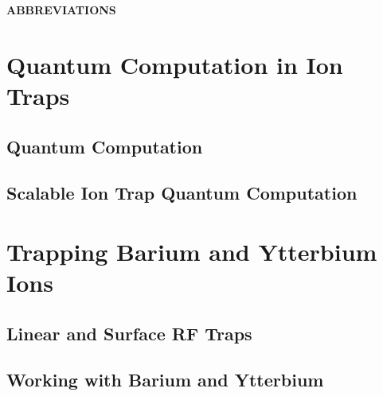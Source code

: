 \documentclass[11pt, twoside]{uwthesis}
\begin{document}
\newcommand{\ion}{$^{+}$}
\newcommand{\degree}{$^{\circ}$}
\newcommand{\baseven}{$^{137}$Ba$^{+}$}
\newcommand{\ba}{$^{138}$Ba$^{+}$}
\newcommand{\curdir}{theory}

\prelimpages



\titlepage

\newpage
\copyrightpage

\abstract{

}

\tableofcontents
\listoffigures
\listoftables

\newpage
\begin{center}
{\bf\Large ABBREVIATIONS}
\end{center}


\acknowledgments{

}

\textpages

\part{Quantum Computation in Ion Traps}

\chapter{Quantum Computation}
\renewcommand{\curdir}{qcomp}
\label{sec:qcomp}

\chapter{Scalable Ion Trap Quantum Computation}
\renewcommand{\curdir}{musiqc}
\label{sec:musiqc}



\part{Trapping Barium and Ytterbium Ions}

\chapter{Linear and Surface RF Traps}
\renewcommand{\curdir}{trap}
\label{sec:trap}

\chapter{Working with Barium and Ytterbium}
\renewcommand{\curdir}{ioncool}
\label{sec:ioncool}

\end{document}
